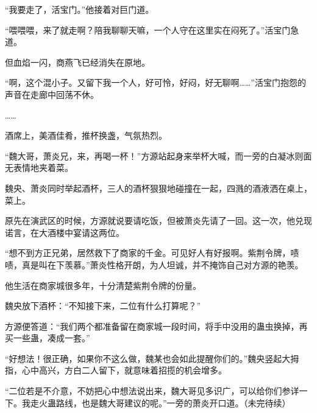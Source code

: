 \begin{this_body}
“我要走了，活宝门。”他接着对巨门道。

“喂喂喂，来了就走啊？陪我聊聊天嘛，一个人守在这里实在闷死了。”活宝门急道。

但血焰一闪，商燕飞已经消失在原地。

“啊，这个混小子。又留下我一个人，好可怜，好闷，好无聊啊……”活宝门抱怨的声音在走廊中回荡不休。

……

酒席上，美酒佳肴，推杯换盏，气氛热烈。

“魏大哥，萧炎兄，来，再喝一杯！”方源站起身来举杯大喊，而一旁的白凝冰则面无表情地夹着菜。

魏央、萧炎同时举起酒杯，三人的酒杯狠狠地碰撞在一起，四溅的酒液洒在桌上，菜上。

原先在演武区的时候，方源就说要请吃饭，但被萧炎先请了一回。这一次，他兑现诺言，在大酒楼中宴请这两位。

“想不到方正兄弟，居然救下了商家的千金。可见好人有好报啊。紫荆令牌，啧啧，真是叫在下羡慕。”萧炎性格开朗，为人坦诚，并不掩饰自己对方源的艳羡。

他生活在商家城很多年，十分清楚紫荆令牌的份量。

魏央放下酒杯：“不知接下来，二位有什么打算呢？”

方源便答道：“我们两个都准备留在商家城一段时间，将手中没用的蛊虫换掉，再买一些蛊，凑成一套。”

“好想法！很正确，如果你不这么做，魏某也会如此提醒你们的。”魏央竖起大拇指，心中高兴，方白二人留下，就意味着招揽的机会增多。

“二位若是不介意，不妨把心中想法说出来，魏大哥见多识广，可以给你们参详一下。我走火蛊路线，也是魏大哥建议的呢。”一旁的萧炎开口道。（未完待续）

\end{this_body}

